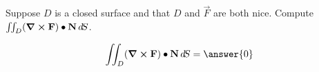 \documentclass{ximera}
\author{David Guichard \and Neal Koblitz \and H. Jerome Keisler \and Albert Scheller \and Barry Balof \and Mike Wills \and Matthew Carr}
\begin{document}
\begin{exercise}




Suppose $D$ is a closed surface and that $D$ and $\vec{F}$ are both nice. Compute $\iint_{D}(\boldsymbol\nabla\boldsymbol\times\mathbf{F})\bullet\mathbf{N}\mathop{}\!d\! S$.

\begin{prompt}
\[
\iint_{D}(\curl\vec{F})\dotp\vec{N}\d S=\answer{0}
\]
\end{prompt}


\end{exercise}
\end{document}
